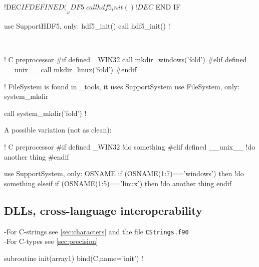 \documentclass{article}
\begin{document}
\begin{codea}
!DEC$ IF DEFINED(__HDF5__)
   call hdf5_init()
!DEC$ END IF
\end{codea}
\begin{codeb}
use SupportHDF5, only: hdf5_init()
call hdf5_init()
!
\end{codeb}\\
\begin{codea}
! C preprocessor
#if defined _WIN32
  call mkdir_windows('fold')
#elif defined __unix__
  call mkdir_linux('fold')
#endif
\end{codea}
\begin{codeb}
! FileSystem is found in _tools, it uses SupportSystem
use FileSystem, only: system_mkdir 

call system_mkdir('fold')
!
\end{codeb}
A possible variation (not as clean):\\
\begin{codea}
! C preprocessor
#if defined _WIN32
  !do something
#elif defined __unix__
  !do another thing
#endif
\end{codea}
\begin{codeb}
use SupportSystem, only: OSNAME
if (OSNAME(1:7)=='windows') then
    !do something
elseif if (OSNAME(1:5)=='linux') then
    !do another thing
endif
\end{codeb}


\subsection{DLLs, cross-language interoperability}
\label{sec:dlls}
-For C-strings see \autoref{sec:characters} and the file \verb|CStrings.f90|\\
-For C-types see \autoref{sec:precision}\\

\begin{codeb}
subroutine init(array1) bind(C,name='init')
!
\end{codeb}
\end{document}
